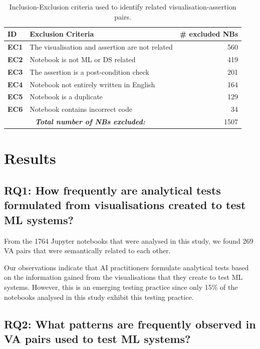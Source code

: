 \documentclass[conference]{IEEEtran}
\begin{document}
\begin{table}
  \centering
  \caption{Inclusion-Exclusion criteria used to identify related visualisation-assertion pairs.}\label{tab:exclusion-criteria}
  \begin{tabularx}{0.47\textwidth}{@{}l X r@{}}
    \toprule
    \textbf{ID} &
    \textbf{Exclusion Criteria} &
    \textbf{\# excluded NBs}\\
    \midrule
    \textbf{EC1} &
    The visualisation and assertion are not related &
    560\\
    \textbf{EC2} &
    Notebook is not ML or DS related &
    419\\
    \textbf{EC3} &
    The assertion is a post-condition check &
    201\\
    \textbf{EC4} &
    Notebook not entirely written in English &
    164\\
    \textbf{EC5} &
    Notebook is a duplicate &
    129\\
    \textbf{EC6} &
    Notebook contains incorrect code &
    34\\
    \midrule
    \multicolumn{2}{c}{\emph{\textbf{Total number of NBs excluded:}}} &
    1507\\
    \bottomrule
  \end{tabularx}
\end{table}

\section{Results}\label{sec:result}
\subsection{RQ1: How frequently are analytical tests formulated from visualisations created to test ML systems?}\label{sec:result-rq1}

From the 1764 Jupyter notebooks that were analysed in this study, we found 269 VA pairs that were semantically related to each other.

Our observations indicate that AI practitioners formulate analytical tests based on the information gained from the visualisations that they create to test ML systems. However, this is an emerging testing practice since only 15\% of the notebooks analysed in this study exhibit this testing practice.

\subsection{RQ2: What patterns are frequently observed in VA pairs used to test ML systems?}\label{sec:result-rq2}
\end{document}
